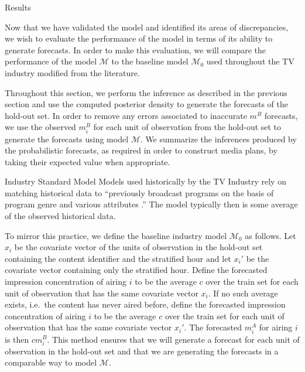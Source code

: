 \begin{chapter}{Results}

  Now that we have validated the model and identified its areas of discrepancies,
  we wish to evaluate the performance of the model in terms of its ability to
  generate forecasts. In order to make this evaluation, we will compare
  the performance of the model $\mathcal{M}$ to the baseline model $\mathcal{M}_0$
  used throughout the TV industry modified from the literature.

  Throughout this section, we perform the inference as described in the previous section
  and use the computed posterior density to generate the forecasts of the hold-out set.
  In order to remove any errors associated to inaccurate $m^B$ forecasts, we use the observed
  $m_i^B$ for each unit of observation from the hold-out set to generate the forecasts using model $\mathcal{M}$.
  We summarize the inferences produced by the probabilistic forecasts,
  as required in order to construct media plans, by taking their expected value when appropriate.

  \begin{section}{Industry Standard Model}
    Models used historically by the TV Industry rely on matching historical
    data to ``previously broadcast programs on the basis of program genre
    and various attributes \cite{tvforecasting}.'' The model typically then is some average of the observed historical data.

    To mirror this practice, we define the baseline industry model $\mathcal{M}_0$ as follows.
    Let $x_i$ be the covariate vector of the units of observation in the hold-out set
    containing the content identifier and the stratified hour and let $x_i'$ be the covariate vector
    containing only the stratified hour. Define the forecasted impression concentration
    of airing $i$ to be the average $c$ over the train set for each unit of observation that has the same covariate vector $x_i$.
    If no such average exists, i.e.\ the content has never aired before, define the
    forecasted impression concentration of airing $i$ to be the average $c$ over the train set for each unit of observation that has
    the same covariate vector $x_i'$. The forecasted $m_i^A$ for airing $i$ is then $c m_i^B $.
    This method ensures that we will generate a forecast for each unit of observation in the hold-out set
    and that we are generating the forecasts in a comparable way to model $\mathcal{M}$.
  \end{section}


\end{chapter}
